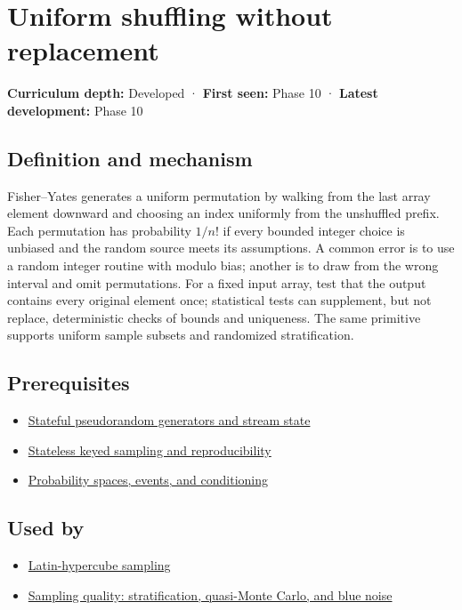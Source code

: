\hypertarget{appendix-184fcc411663}{}
\section{Uniform shuffling without replacement}\label{appendix-184fcc411663-uniform-shuffling-without-replacement}

\textbf{Curriculum depth:} Developed · \textbf{First seen:} Phase 10 · \textbf{Latest development:} Phase 10

\subsection{Definition and mechanism}\label{appendix-184fcc411663-definition-and-mechanism}

Fisher--Yates generates a uniform permutation by walking from the last array element downward and choosing an index uniformly from the unshuffled prefix. Each permutation has probability \(1/n!\) if every bounded integer choice is unbiased and the random source meets its assumptions. A common error is to use a random integer routine with modulo bias; another is to draw from the wrong interval and omit permutations. For a fixed input array, test that the output contains every original element once; statistical tests can supplement, but not replace, deterministic checks of bounds and uniqueness. The same primitive supports uniform sample subsets and randomized stratification.

\subsection{Prerequisites}\label{appendix-184fcc411663-prerequisites}

\begin{itemize}
\tightlist
\item
  \hyperref[appendix-e0f7c7e08f3a]{Stateful pseudorandom generators and stream state}
\item
  \hyperref[appendix-daaf25bfd3a0]{Stateless keyed sampling and reproducibility}
\item
  \hyperref[appendix-f1ef323f6ed7]{Probability spaces, events, and conditioning}
\end{itemize}

\subsection{Used by}\label{appendix-184fcc411663-used-by}

\begin{itemize}
\tightlist
\item
  \hyperref[appendix-1c5e85693a06]{Latin-hypercube sampling}
\item
  \hyperref[appendix-9f693ffd82bc]{Sampling quality: stratification, quasi-Monte Carlo, and blue noise}
\end{itemize}

